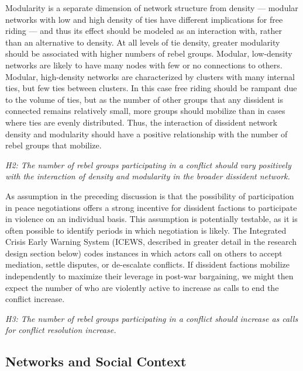 Modularity is a separate dimension of network structure from density --- modular networks with low and high density of ties have different implications for free riding --- and thus its effect should be modeled as an interaction with, rather than an alternative to density. At all levels of tie density, greater modularity should be associated with higher numbers of rebel groups. Modular, low-density networks are likely to have many nodes with few or no connections to others. Modular, high-density networks are characterized by clusters with many internal ties, but few ties between clusters. In this case free riding should be rampant due to the volume of ties, but as the number of other groups that any dissident is connected remains relatively small, more groups should mobilize than in cases where ties are evenly distributed. Thus, the interaction of dissident network density and modularity should have a positive relationship with the number of rebel groups that mobilize.

\noindent \textit{H2: The number of rebel groups participating in a conflict should vary positively with the interaction of density and modularity in the broader dissident network.}

As assumption in the preceding discussion is that the possibility of participation in peace negotiations offers a strong incentive for dissident factions to participate in violence on an individual basis. This assumption is potentially testable, as it is often possible to identify periods in which negotiation is likely. The Integrated Crisis Early Warning System (ICEWS, described in greater detail in the research design section below) codes instances in which actors call on others to accept mediation, settle disputes, or de-escalate conflicts. If dissident factions mobilize independently to maximize their leverage in post-war bargaining, we might then expect the number of who are violently active to increase as calls to end the conflict increase.

\noindent \textit{H3: The number of rebel groups participating in a conflict should increase as calls for conflict resolution increase.}

\subsection{Networks and Social Context}

